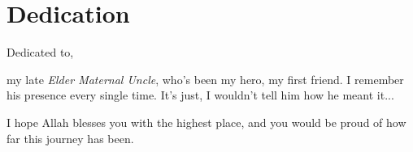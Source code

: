 \clearpage
\setcounter{secnumdepth}{-1}
\section{\hfil Dedication \hfil}
\vspace{1cm}
\thispagestyle{front}

\vspace{1cm}

\noindent
\hspace{1cm} Dedicated to,\par
\hspace{2cm} my late \textit{Elder Maternal Uncle}, who's been my hero, my first friend. I remember his presence every single time. It's just, I wouldn't tell him how he meant it... \par
\hspace{3cm} I hope Allah blesses you with the highest place, and you would be proud of how far this journey has been.

\vfill
\setcounter{secnumdepth}{3}
\clearpage
